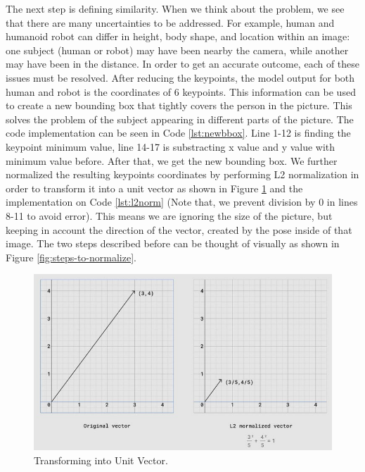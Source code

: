 

The next step is defining similarity. When we think about the problem, we see that there are many uncertainties to be addressed. For example, human and humanoid robot can differ in height, body shape, and location within an image: one subject (human or robot) may have been nearby the camera,
while another may have been in the distance. In order to get an accurate outcome, each of these issues must be resolved.
After reducing the keypoints, the model output for both human and robot is the coordinates of 6 keypoints. This information can be used to create a new bounding box that tightly covers the person in the picture. This solves the problem of the subject appearing in different parts of the picture.
The code implementation can be seen in Code \ref{lst:newbbox}. Line 1-12 is finding the keypoint minimum value, line 14-17 is substracting x value and y value with minimum value before. After that, we get the new bounding box.
We further normalized the resulting keypoints coordinates by performing L2 normalization in order to transform it into a unit vector as shown in Figure \ref{fig:transforming-into-unit-vector} and the implementation on Code \ref{lst:l2norm} (Note that, we prevent division by 0 in lines 8-11 to avoid error).
This means we are ignoring the size of the picture, but keeping in account the direction of the vector, created by the pose inside of that image.
The two steps described before can be thought of visually as shown in Figure \ref{fig:steps-to-normalize}.



\begin{figure}[ht]
  \centering
  \includegraphics[scale=0.9]{gambar/transform-to-unit-vector.png}
  \caption{Transforming into Unit Vector.}
  \label{fig:transforming-into-unit-vector}
\end{figure}

